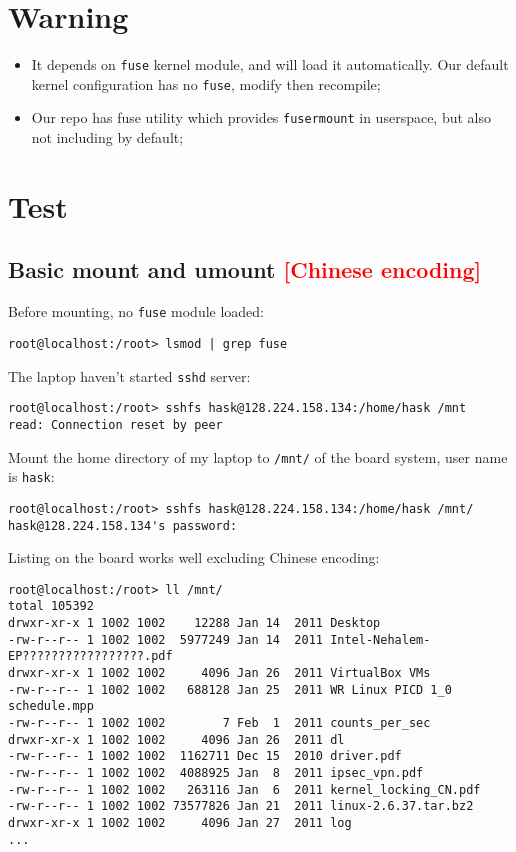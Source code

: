 \documentclass[a4paper]{report}
\begin{document}
\begin{enumerate}
\section{Warning}
\begin{itemize}
    \item It depends on {\tt fuse} kernel module, and will load it automatically.
          Our default kernel configuration has no {\tt fuse}, modify then recompile;
    \item Our repo has {fuse} utility which provides {\tt fusermount} in userspace,
          but also not including by default;
\end{itemize}
\section{Test}
\subsection{Basic mount and umount \textcolor{red}{[Chinese encoding]}}
Before mounting, no {\tt fuse} module loaded:
\begin{lstlisting}
root@localhost:/root> lsmod | grep fuse
\end{lstlisting}
The laptop haven't started {\tt sshd} server:
\begin{lstlisting}
root@localhost:/root> sshfs hask@128.224.158.134:/home/hask /mnt
read: Connection reset by peer
\end{lstlisting}
Mount the home directory of my laptop to {\tt /mnt/} of the board system, 
user name is {\tt hask}:
\begin{lstlisting}
root@localhost:/root> sshfs hask@128.224.158.134:/home/hask /mnt/
hask@128.224.158.134's password: 
\end{lstlisting}
Listing on the board works well excluding Chinese encoding:
\begin{lstlisting}
root@localhost:/root> ll /mnt/
total 105392
drwxr-xr-x 1 1002 1002    12288 Jan 14  2011 Desktop
-rw-r--r-- 1 1002 1002  5977249 Jan 14  2011 Intel-Nehalem-EP?????????????????.pdf
drwxr-xr-x 1 1002 1002     4096 Jan 26  2011 VirtualBox VMs
-rw-r--r-- 1 1002 1002   688128 Jan 25  2011 WR Linux PICD 1_0 schedule.mpp
-rw-r--r-- 1 1002 1002        7 Feb  1  2011 counts_per_sec
drwxr-xr-x 1 1002 1002     4096 Jan 26  2011 dl
-rw-r--r-- 1 1002 1002  1162711 Dec 15  2010 driver.pdf
-rw-r--r-- 1 1002 1002  4088925 Jan  8  2011 ipsec_vpn.pdf
-rw-r--r-- 1 1002 1002   263116 Jan  6  2011 kernel_locking_CN.pdf
-rw-r--r-- 1 1002 1002 73577826 Jan 21  2011 linux-2.6.37.tar.bz2
drwxr-xr-x 1 1002 1002     4096 Jan 27  2011 log
...


\end{lstlisting}
\end{enumerate}
\end{document}

